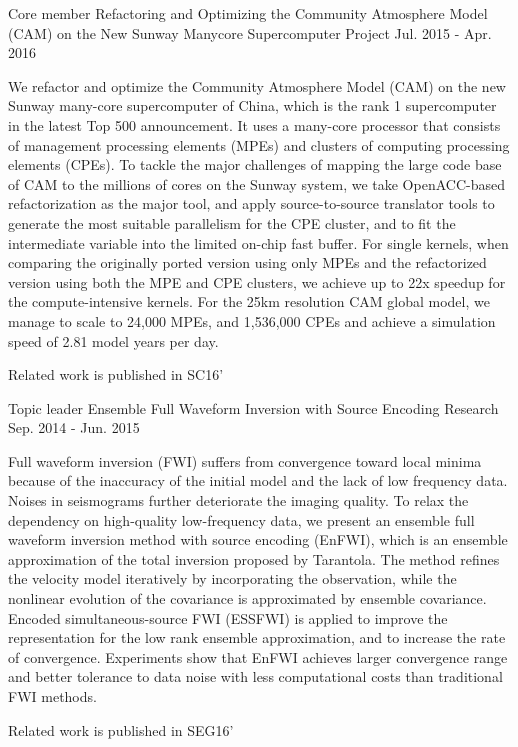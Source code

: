 \documentclass[11pt, a4paper]{awesome-cv}
\begin{document}
\begin{cventries}
  \cventry
    {Core member} %
    {Refactoring and Optimizing the Community Atmosphere Model (CAM) on the New Sunway Manycore Supercomputer} %
    {Project} %
    {Jul. 2015 - Apr. 2016} %
    {
      \begin{cvitems} %
        \item {We refactor and optimize the Community Atmosphere Model (CAM) on the new Sunway many-core supercomputer of China, which is the rank 1 supercomputer in the latest Top 500 announcement. It uses a many-core processor that consists of management processing elements (MPEs) and clusters of computing processing elements (CPEs). To tackle the major challenges of mapping the large code base of CAM to the millions of cores on the Sunway system, we take OpenACC-based refactorization as the major tool, and apply source-to-source translator tools to generate the most suitable parallelism for the CPE cluster, and to fit the intermediate variable into the limited on-chip fast buffer. For single kernels, when comparing the originally ported version using only MPEs and the refactorized version using both the MPE and CPE clusters, we achieve up to 22x speedup for the compute-intensive kernels. For the 25km resolution CAM global model, we manage to scale to 24,000 MPEs, and 1,536,000 CPEs and achieve a simulation speed of 2.81 model years per day.}
        \item {Related work is published in SC16'}
      \end{cvitems}
    }

  \cventry
    {Topic leader} %
    {Ensemble Full Waveform Inversion with Source Encoding} %
    {Research} %
    {Sep. 2014 - Jun. 2015} %
    {
      \begin{cvitems} %
        \item {Full waveform inversion (FWI) suffers from convergence toward local minima because of the inaccuracy of the initial model and the lack of low frequency data. Noises in seismograms further deteriorate the imaging quality. To relax the dependency on high-quality low-frequency data, we present an ensemble full waveform inversion method with source encoding (EnFWI), which is an ensemble approximation of the total inversion proposed by Tarantola. The method refines the velocity model iteratively by incorporating the observation, while the nonlinear evolution of the covariance is approximated by ensemble covariance. Encoded simultaneous-source FWI (ESSFWI) is applied to improve the representation for the low rank ensemble approximation, and to increase the rate of convergence. Experiments show that EnFWI achieves larger convergence range and better tolerance to data noise with less computational costs than traditional FWI methods.}
        \item {Related work is published in SEG16'}
      \end{cvitems}
    }


\end{cventries}
\end{document}
